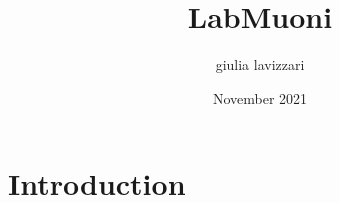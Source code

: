 \documentclass{article}
\title{LabMuoni}
\author{giulia lavizzari}
\date{November 2021}
\begin{document}
\maketitle

\section{Introduction}
\end{document}
